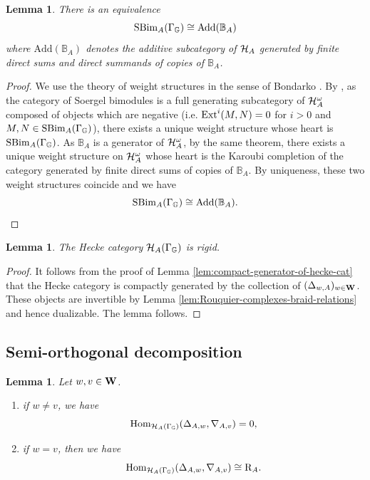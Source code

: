 \documentclass[a4paper, 10pt, oneside, reqno]{amsart}
\theoremstyle{plain}
\newtheorem{lem}[thm]{Lemma}
\theoremstyle{definition}
\theoremstyle{remark}
\newcommand{\Gbb}{\mathbb{G}}
\newcommand{\RR}{\mathrm{R}}
\newcommand{\Add}{\mathrm{Add}}
\begin{document}
\begin{lem}\label{lem:additive-generator}
There is an equivalence 
$$\SBim_A(\Gamma_{\Gbb}) \cong \Add(\mathbb{B}_A)$$ 
where $\Add(\mathbb{B}_A)$ denotes the additive subcategory of $\mathcal{H}_{A}$ generated by finite direct sums and direct summands of copies of $\mathbb{B}_A$. 
\end{lem}

\begin{proof}
We use the theory of weight structures in the sense of Bondarko \cite{Bondarko}. By \cite[Theorem 4.3.2]{Bondarko}, as the category of Soergel bimodules is a full generating subcategory of $\mathcal{H}_A^{\omega}$ composed of objects which are negative (i.e. $\mathrm{Ext}^i(M,N) = 0$ for $i > 0$ and $M,N \in \SBim_A(\Gamma_{\Gbb})$), there exists a unique weight structure whose heart is $\SBim_{A}(\Gamma_{\Gbb})$. As $\mathbb{B}_A$ is a generator of $\mathcal{H}_A^{\omega}$, by the same theorem, there exists a unique weight structure on $\mathcal{H}_A^{\omega}$ whose heart is the Karoubi completion of the category generated by finite direct sums of copies of $\mathbb{B}_A$. By uniqueness, these two weight structures coincide and we have 
$$\SBim_A(\Gamma_{\Gbb}) \cong \Add(\mathbb{B}_A).$$
\end{proof}

\begin{lem}\label{lem:hecke-category-is-rigid}
The Hecke category $\Hcal_{A}(\Gamma_{\Gbb})$ is rigid. 
\end{lem}

\begin{proof}
It follows from the proof of Lemma \ref{lem:compact-generator-of-hecke-cat} that the Hecke category is compactly generated by the collection of $(\Delta_{w,A})_{w \in \mathbf{W}}$. These objects are invertible by Lemma \ref{lem:Rouquier-complexes-braid-relations} and hence dualizable. The lemma follows.
\end{proof}

\subsection{Semi-orthogonal decomposition}

\begin{lem}\label{lem:orthogonality}
Let $w,v \in \mathbf{W}$. 
\begin{enumerate}
\item if $w \neq v$, we have 
$$\Hom_{\Hcal_{A}(\Gamma_{\Gbb})}(\Delta_{A,w}, \nabla_{A,v}) = 0,$$
\item if $w = v$, then we have 
$$\Hom_{\Hcal_{A}(\Gamma_{\Gbb})}(\Delta_{A,w}, \nabla_{A,v}) \cong \RR_{A}.$$
\end{enumerate}
\end{lem}
\end{document}

